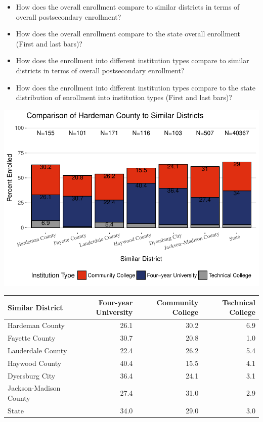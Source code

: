 \documentclass[11pt,]{article}
\providecommand{\tightlist}{%
  \setlength{\itemsep}{0pt}\setlength{\parskip}{0pt}}
\begin{document}
\begin{itemize}
\tightlist
\item
  How does the overall enrollment compare to similar districts in terms
  of overall postsecondary enrollment?\\
\item
  How does the overall enrollment compare to the state overall
  enrollment (First and last bars)?\\
\item
  How does the enrollment into different institution types compare to
  similar districts in terms of overall postsecondary enrollment?\\
\item
  How does the enrollment into different institution types compare to
  the state distribution of enrollment into institution types (First and
  last bars)?
\end{itemize}

\includegraphics{20170419_PSWRR_files/figure-latex/comparison_districts-1.pdf}

\begin{longtable}[]{@{}lrrr@{}}
\toprule
Similar District & Four-year University & Community College & Technical
College\tabularnewline
\midrule
\endhead
Hardeman County & 26.1 & 30.2 & 6.9\tabularnewline
Fayette County & 30.7 & 20.8 & 1.0\tabularnewline
Lauderdale County & 22.4 & 26.2 & 5.4\tabularnewline
Haywood County & 40.4 & 15.5 & 4.1\tabularnewline
Dyersburg City & 36.4 & 24.1 & 3.1\tabularnewline
Jackson-Madison County & 27.4 & 31.0 & 2.9\tabularnewline
State & 34.0 & 29.0 & 3.0\tabularnewline
\bottomrule
\end{longtable}
\end{document}
